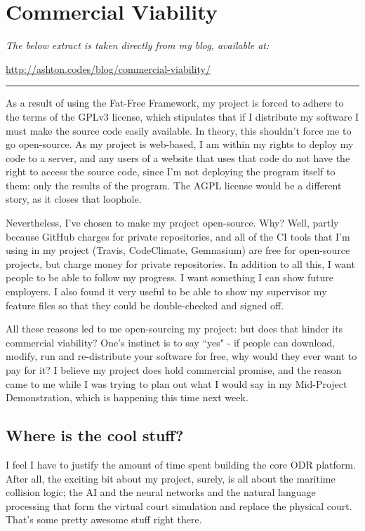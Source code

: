 \chapter{Commercial Viability} \label{appendix:commercialViability}

\emph{The below extract is taken directly from my blog, available at:}

\url{http://ashton.codes/blog/commercial-viability/}

\rule{\textwidth}{1pt}

As a result of using the Fat-Free Framework, my project is forced to adhere to the terms of the GPLv3 license, which stipulates that if I distribute my software I must make the source code easily available. In theory, this shouldn't force me to go open-source. As my project is web-based, I am within my rights to deploy my code to a server, and any users of a website that uses that code do not have the right to access the source code, since I'm not deploying the program itself to them: only the results of the program. The AGPL license would be a different story, as it closes that loophole.

Nevertheless, I've chosen to make my project open-source. Why? Well, partly because GitHub charges for private repositories, and all of the CI tools that I'm using in my project (Travis, CodeClimate, Gemnasium) are free for open-source projects, but charge money for private repositories. In addition to all this, I want people to be able to follow my progress. I want something I can show future employers. I also found it very useful to be able to show my supervisor my feature files so that they could be double-checked and signed off.

All these reasons led to me open-sourcing my project: but does that hinder its commercial viability? One's instinct is to say ``yes" - if people can download, modify, run and re-distribute your software for free, why would they ever want to pay for it? I believe my project does hold commercial promise, and the reason came to me while I was trying to plan out what I would say in my Mid-Project Demonstration, which is happening this time next week.

\section{Where is the cool stuff?}

I feel I have to justify the amount of time spent building the core ODR platform. After all, the exciting bit about my project, surely, is all about the maritime collision logic; the AI and the neural networks and the natural language processing that form the virtual court simulation and replace the physical court. That's some pretty awesome stuff right there.

